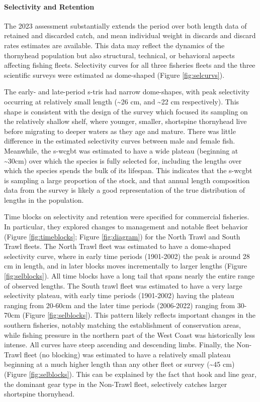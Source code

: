 \documentclass[11pt,
  letterpaper,
]{article}
\begin{document}
\hypertarget{selectivity-and-retention-1}{%
\paragraph{Selectivity and Retention}\label{selectivity-and-retention-1}}

The 2023 assessment substantially extends the period over both length data of retained and discarded catch, and mean individual weight in discards and discard rates estimates are available. This data may reflect the dynamics of the thornyhead population but also structural, technical, or behavioral aspects affecting fishing fleets. Selectivity curves for all three fisheries fleets and the three scientific surveys were estimated as dome-shaped (Figure \ref{fig:selcurvs}).

The early- and late-period \gls{s-tri}s had narrow dome-shapes, with peak selectivity occurring at relatively small length (\textasciitilde26 cm, and \textasciitilde22 cm respectively). This shape is consistent with the design of the survey which focused its sampling on the relatively shallow shelf, where younger, smaller, shortspine thornyhead live before migrating to deeper waters as they age and mature. There was little difference in the estimated selectivity curves between male and female fish. Meanwhile, the \gls{s-wcgbt} was estimated to have a wide plateau (beginning at \textasciitilde30cm) over which the species is fully selected for, including the lengths over which the species spends the bulk of its lifespan. This indicates that the \gls{s-wcgbt} is sampling a large proportion of the stock, and that annual length composition data from the survey is likely a good representation of the true distribution of lengths in the population.

Time blocks on selectivity and retention were specified for commercial fisheries. In particular, they explored changes to management and notable fleet behavior (Figure \ref{fig:timeblocks}; Figure \ref{fig:diagram}) for the North Trawl and South Trawl fleets. The North Trawl fleet was estimated to have a dome-shaped selectivity curve, where in early time periods (1901-2002) the peak is around 28 cm in length, and in later blocks moves incrementally to larger lengths (Figure \ref{fig:selblocks}). All time blocks have a long tail that spans nearly the entire range of observed lengths. The South trawl fleet was estimated to have a very large selectivity plateau, with early time periods (1901-2002) having the plateau ranging from 20-60cm and the later time periods (2006-2022) ranging from 30-70cm (Figure \ref{fig:selblocks}). This pattern likely reflects important changes in the southern fisheries, notably matching the establishment of conservation areas, while fishing pressure in the northern part of the West Coast was historically less intense. All curves have steep ascending and descending limbs. Finally, the Non-Trawl fleet (no blocking) was estimated to have a relatively small plateau beginning at a much higher length than any other fleet or survey (\textasciitilde45 cm) (Figure \ref{fig:selblocks}). This can be explained by the fact that hook and line gear, the dominant gear type in the Non-Trawl fleet, selectively catches larger shortspine thornyhead.
\end{document}

